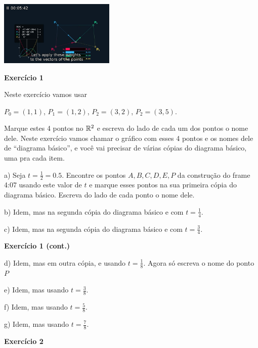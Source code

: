 \documentclass[oneside,12pt]{article}
\begin{document}
\includegraphics[width=5.5cm]{2021-2-C3/bezier_5:42.png}


\newpage


{\bf Exercício 1}

Neste exercício vamos usar

$P_0=(1,1)$, $P_1=(1,2)$, $P_2=(3,2)$, $P_2=(3,5)$.

\ssk

Marque estes 4 pontos no $\mathbb{R}^2$ e escreva do lado de cada um dos
pontos o nome dele. Neste exercício vamos chamar o gráfico com esses 4
pontos e os nomes dele de ``diagrama básico'', e você vai precisar de
várias cópias do diagrama básico, uma pra cada item.

\msk

a) Seja $t=\frac12=0.5$. Encontre os pontos $A,B,C,D,E,P$ da
construção do frame 4:07 usando este valor de $t$ e marque esses
pontos na sua primeira cópia do diagrama básico. Escreva do lado de
cada ponto o nome dele.

b) Idem, mas na segunda cópia do diagrama básico e com $t=\frac14$.

c) Idem, mas na segunda cópia do diagrama básico e com $t=\frac34$.

\newpage


{\bf Exercício 1 (cont.)}

d) Idem, mas em outra cópia, e usando $t=\frac18$. Agora só escreva o
nome do ponto $P$

e) Idem, mas usando $t=\frac38$.

f) Idem, mas usando $t=\frac58$.

g) Idem, mas usando $t=\frac78$.

\bsk

{\bf Exercício 2}
\end{document}
